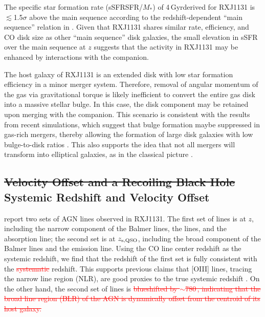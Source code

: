 \documentclass[]{emulateapj}
\newcommand{\new}[1]{\textcolor{blue}{\uwave{#1}}}
\newcommand{\old}[1]{\textcolor{red}{\st{#1}}} %
\begin{document}
The specific star formation rate (sSFR\eq SFR/$M_*$) of 4\,Gyr\pmOne derived for RXJ1131
is $\lesssim$1.5$\sigma$ above the main sequence according to
the redshift-dependent ``main sequence'' relation in \citet[and references therein]{Tacconi13a}.
Given that RXJ1131 shares similar \SF rate, \SF efficiency, and CO disk size as other ``main sequence'' disk galaxies,
the small elevation in sSFR over the main sequence at $z$ suggests
that the \SF activity in RXJ1131 may be enhanced by interactions with the companion.

The host galaxy of RXJ1131 is an extended disk with low star formation efficiency in a minor merger
system. Therefore, removal of angular momentum of the gas via gravitational torque is likely inefficient to convert the
entire gas disk into a massive stellar bulge.
In this case, the disk component may be retained upon merging with the companion.
This scenario is consistent with the results from recent simulations, which suggest that bulge formation maybe
suppressed in gas-rich mergers, thereby allowing the formation of large disk galaxies with low bulge-to-disk ratios
\citep{Springel05a, Robertson06a, Hopkins09a}. This also supports the idea that not all mergers will transform into
elliptical galaxies, as in the classical picture \citep{Toomre72a}.


\subsection{\texorpdfstring{\st{Velocity Offset and a Recoiling Black Hole}}{ } Systemic Redshift and Velocity Offset}
\citet[]{Sluse07a} report two sets of AGN lines observed in RXJ1131.
The first set of lines is at $z$, including the narrow component of the Balmer lines, the \oiii lines, and the \mgii absorption line; the second set is at $z_{\rm s, QSO}$, including the broad component of the Balmer lines and
the \mgii emission line.
Using the CO line center redshift as the systemic redshift,
we find that the redshift of the first set is fully consistent with the \old{systematic}\new{systemic} redshift. This
supports previous claims that [O{\scriptsize III}] lines, tracing the narrow line region (NLR),
are good proxies
to the true systemic redshift \citep[e.g.,][]{Vrtilek85a, Nelson00a}.
On the other hand, the second set of lines is \old{blueshifted by $\sim$780\,\kms, indicating that the broad line region (BLR) of the AGN is dynamically offset from the centroid of its host galaxy.}
\new{redshifted by $\sim$715\,\kms.}
\end{document}

